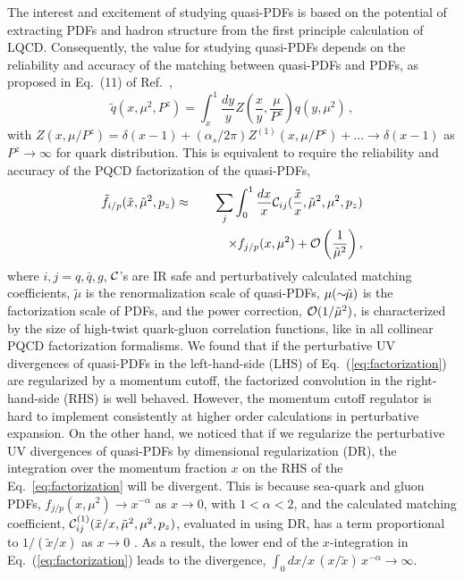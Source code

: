 \documentclass[twocolumn,aps,prd,superscriptaddress,nofootinbib,showpacs]{revtex4}
\begin{document}
The interest and excitement of studying quasi-PDFs is based on the potential of extracting PDFs and hadron structure from the first principle calculation of LQCD.  Consequently, the value for studying quasi-PDFs depends on the reliability and accuracy of the matching between quasi-PDFs and PDFs, as proposed in Eq.~(11) of Ref.~\cite{Ji:2013dva},
\begin{equation}
\label{eq:matching_ji}
\tilde{q}(x,\mu^2,P^z) = \int_x^1 \frac{dy}{y} Z\left(\frac{x}{y},\frac{\mu}{P^z}\right) q(y,\mu^2) \, ,
\end{equation}
with $Z(x,\mu/P^z)=\delta(x-1)+(\alpha_s/2\pi)Z^{(1)}(x,\mu/P^z) +\dots \to \delta(x-1)$ as $P^z\to \infty$ for quark distribution.  This is equivalent to require the reliability and accuracy of the PQCD factorization of the quasi-PDFs,
\begin{eqnarray}
\label{eq:factorization}
\tilde{f}_{i/p}(\tilde{x},\tilde{\mu}^2,p_z) & \approx &
\sum_{j} \int_0^1 \frac{dx}{x} {\cal C}_{ij}(\frac{\tilde{x}}{x},\tilde{\mu}^2,\mu^2,p_z)
\nonumber \\
&& \hskip 0.3in
\times f_{j/p}(x,\mu^2) + {\cal O}\left(\frac{1}{\tilde{\mu}^2}\right),
\end{eqnarray}
where $i, j =q, \bar{q}, g$, ${\cal C}$'s are IR safe and perturbatively calculated matching coefficients,  $\tilde{\mu}$ is the renormalization scale of quasi-PDFs, $\mu (\sim{\hskip -0.05in}\tilde{\mu})$ is the factorization scale of PDFs, and the power correction, ${\cal O}(1/\tilde{\mu}^2)$, is characterized by the size of high-twist quark-gluon correlation functions, like in all collinear PQCD factorization formalisms. We found that if the perturbative UV divergences of quasi-PDFs in the left-hand-side (LHS) of Eq.~(\ref{eq:factorization}) are regularized by a momentum cutoff, the factorized convolution in the right-hand-side (RHS) is well behaved. However, the momentum cutoff regulator is hard to implement consistently at higher order calculations in perturbative expansion.  On the other hand, we noticed that if we regularize the perturbative UV divergences of quasi-PDFs by dimensional regularization (DR), the integration over the momentum fraction $x$ on the RHS of the Eq.~\eqref{eq:factorization} will be divergent. This is because sea-quark and gluon PDFs, $f_{j/p}(x,\mu^2) \to x^{-\alpha}$ as $x\to0$, with $1<\alpha<2$, and the calculated matching coefficient, ${\cal C}^{(1)}_{ij}(\tilde{x}/x,\tilde{\mu}^2,\mu^2,p_z)$, evaluated in using DR, has a term proportional to $1/(\tilde{x}/x)$ as $x\to 0$  \cite{Ma:2014jla,Xiong:2013bka}.  As a result, the lower end of the $x$-integration in Eq.~(\ref{eq:factorization}) leads to the divergence, $\int_0 dx/x\, (x/\tilde{x})\, x^{-\alpha} \to \infty$.
\end{document}
